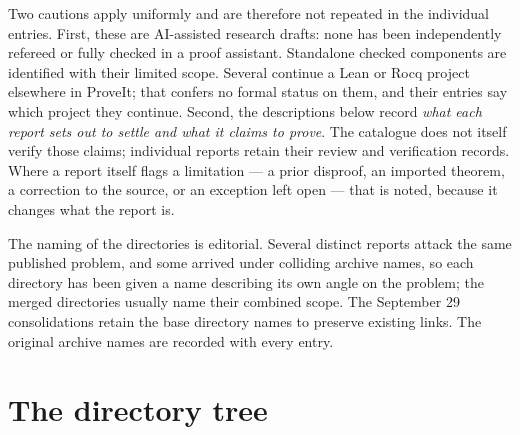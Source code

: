 \documentclass[11pt]{article}
\begin{document}
Two cautions apply uniformly and are therefore not repeated in the individual
entries. First, these are AI-assisted research drafts: none has been
independently refereed or fully checked in a proof assistant. Standalone
checked components are identified with their limited scope.
Several continue a Lean or Rocq project elsewhere in ProveIt; that confers no
formal status on them, and their entries say which project they continue.  Second,
the descriptions below record \emph{what each report sets out to settle and what
it claims to prove}. The catalogue does not itself verify those claims;
individual reports retain their review and verification records.
Where a report itself flags a limitation --- a prior disproof, an imported
theorem, a correction to the source, or an exception left open --- that is noted,
because it changes what the report is.

The naming of the directories is editorial.  Several distinct reports attack the
same published problem, and some arrived under colliding archive names, so each
directory has been given a name describing its own angle on the problem; the
merged directories usually name their combined scope. The September 29
consolidations retain the base directory names to preserve existing links.  The
original archive names are recorded with every entry.

\clearpage
\section{The directory tree}
\label{sec:tree}
\end{document}

